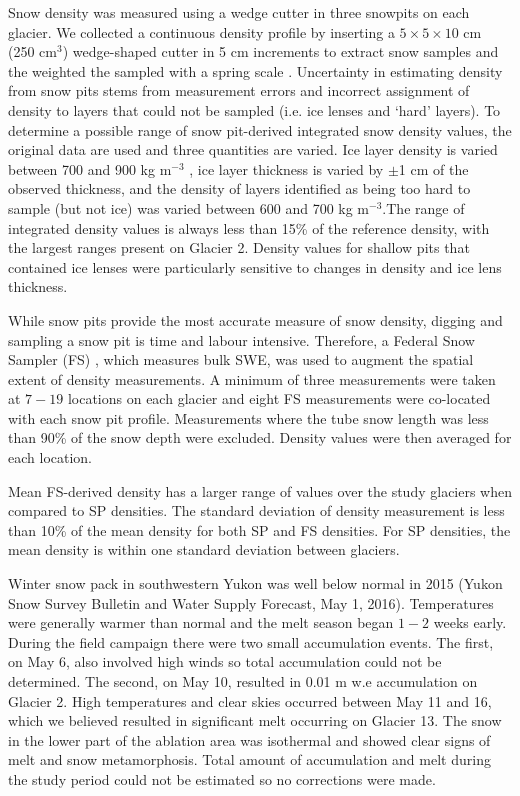 \documentclass[twocolumn,letterpaper]{igs}
\begin{document}
Snow density was measured using a wedge cutter in three snowpits on each glacier. We collected a continuous density profile by inserting a $5\times5\times 10$ cm (250 cm$^3$) wedge-shaped cutter in 5 cm increments to extract snow samples and the weighted the sampled with a spring scale \citep{Gray1981,Fierz2009}. Uncertainty in estimating density from snow pits stems from measurement errors and incorrect assignment of density to layers that could not be sampled (i.e. ice lenses and `hard' layers). To determine a possible range of snow pit-derived integrated snow density values, the original data are used and three quantities are varied. Ice layer density is varied between 700 and 900 kg m$^{-3}$ , ice layer thickness is varied by $\pm$1 cm of the observed thickness, and the density of layers identified as being too hard to sample (but not ice) was varied between 600 and 700 kg m$^{-3}$.The range of integrated density values is always less than 15\% of the reference density, with the largest ranges present on Glacier 2. Density values for shallow pits that contained ice lenses were particularly sensitive to changes in density and ice lens thickness.

While snow pits provide the most accurate measure of snow density, digging and sampling a snow pit is time and labour intensive. Therefore, a Federal Snow Sampler (FS) \citep{Clyde1932}, which measures bulk SWE, was used to augment the spatial extent of density measurements. A minimum of three measurements were taken at $7-19$ locations on each glacier and eight FS measurements were co-located with each snow pit profile. Measurements where the tube snow length was less than 90\% of the snow depth were excluded. Density values were then averaged for each location. 

Mean FS-derived density has a larger range of values over the study glaciers when compared to SP densities. The standard deviation of density measurement is less than 10\% of the mean density for both SP and FS densities. For SP densities, the mean density is within one standard deviation between glaciers.

Winter snow pack in southwestern Yukon was well below normal in 2015 (Yukon Snow Survey Bulletin and Water Supply Forecast, May 1, 2016). Temperatures were generally warmer than normal and the melt season began $1-2$ weeks early. During the field campaign there were two small accumulation events. The first, on May 6, also involved high winds so total accumulation could not be determined. The second, on May 10, resulted in 0.01 m w.e accumulation on Glacier 2. High temperatures and clear skies occurred between May 11 and 16, which we believed resulted in significant melt occurring on Glacier 13. The snow in the lower part of the ablation area was isothermal and showed clear signs of melt and snow metamorphosis. Total amount of accumulation and melt during the study period could not be estimated so no corrections were made. 
\end{document}
